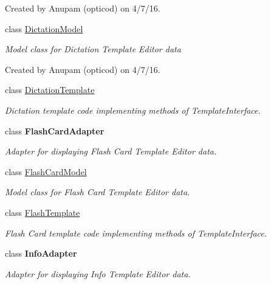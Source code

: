 \begin{DoxyCompactItemize}
\begin{DoxyCompactList}
Created by Anupam (opticod) on 4/7/16. \end{DoxyCompactList}\item 
class \hyperlink{classorg_1_1buildmlearn_1_1toolkit_1_1templates_1_1DictationModel}{Dictation\+Model}
\begin{DoxyCompactList}\small\item\em Model class for Dictation Template Editor data 

Created by Anupam (opticod) on 4/7/16. \end{DoxyCompactList}\item 
class \hyperlink{classorg_1_1buildmlearn_1_1toolkit_1_1templates_1_1DictationTemplate}{Dictation\+Template}
\begin{DoxyCompactList}\small\item\em Dictation template code implementing methods of Template\+Interface. \end{DoxyCompactList}\item 
class {\bfseries Flash\+Card\+Adapter}
\begin{DoxyCompactList}\small\item\em Adapter for displaying Flash Card Template Editor data. \end{DoxyCompactList}\item 
class \hyperlink{classorg_1_1buildmlearn_1_1toolkit_1_1templates_1_1FlashCardModel}{Flash\+Card\+Model}
\begin{DoxyCompactList}\small\item\em Model class for Flash Card Template Editor data. \end{DoxyCompactList}\item 
class \hyperlink{classorg_1_1buildmlearn_1_1toolkit_1_1templates_1_1FlashTemplate}{Flash\+Template}
\begin{DoxyCompactList}\small\item\em Flash Card template code implementing methods of Template\+Interface. \end{DoxyCompactList}\item 
class {\bfseries Info\+Adapter}
\begin{DoxyCompactList}\small\item\em Adapter for displaying Info Template Editor data. 


\end{DoxyCompactList}
\end{DoxyCompactItemize}

